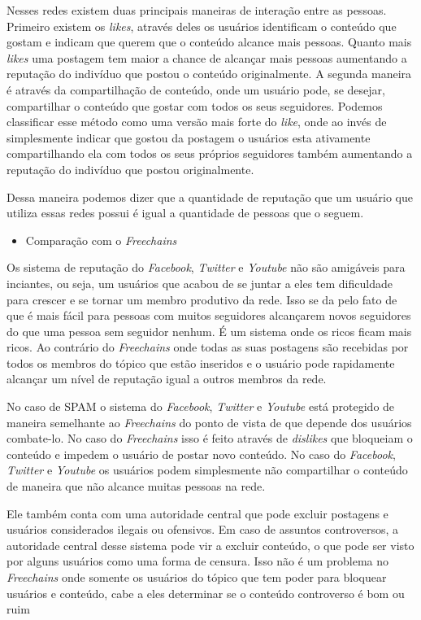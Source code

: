 \documentclass[12pt]{article}
\newcommand{\FC} {\textit{Freechains}\xspace}
\begin{document}
Nesses redes existem duas principais maneiras de interação entre as pessoas.
Primeiro existem os \textit{likes}, através deles os usuários identificam o conteúdo que gostam e indicam que querem que o conteúdo alcance mais pessoas.
Quanto mais \textit{likes} uma postagem tem maior a chance de alcançar mais pessoas aumentando a reputação do indivíduo que postou o conteúdo originalmente.
A segunda maneira é através da compartilhação de conteúdo, onde um usuário pode, se desejar, compartilhar o conteúdo que gostar com todos os seus seguidores.
Podemos classificar esse método como uma versão mais forte do \textit{like}, onde ao invés de simplesmente indicar que gostou da postagem o usuários esta ativamente compartilhando ela com todos os seus próprios seguidores também aumentando a reputação do indivíduo que postou originalmente.

Dessa maneira podemos dizer que a quantidade de reputação que um usuário que utiliza essas redes possui é igual a quantidade de pessoas que o seguem.

\begin{itemize}
    \item Comparação com o \FC
\end{itemize}

Os sistema de reputação do \textit{Facebook}, \textit{Twitter} e \textit{Youtube} não são amigáveis para inciantes, ou seja, um usuários que acabou de se juntar a eles tem dificuldade para crescer e se tornar um membro produtivo da rede.
Isso se da pelo fato de que é mais fácil para pessoas com muitos seguidores alcançarem novos seguidores do que uma pessoa sem seguidor nenhum.
É um sistema onde os ricos ficam mais ricos.
Ao contrário do \FC onde todas as suas postagens são recebidas por todos os membros do tópico que estão inseridos e o usuário pode rapidamente alcançar um nível de reputação igual a outros membros da rede.


No caso de SPAM o sistema do \textit{Facebook}, \textit{Twitter} e \textit{Youtube} está protegido de maneira semelhante ao \FC do ponto de vista de que depende dos usuários combate-lo.
No caso do \FC isso é feito através de \textit{dislikes} que bloqueiam o conteúdo e impedem o usuário de postar novo conteúdo.
No caso do \textit{Facebook}, \textit{Twitter} e \textit{Youtube} os usuários podem simplesmente não compartilhar o conteúdo de maneira que não alcance muitas pessoas na rede.

Ele também conta com uma autoridade central que pode excluir postagens e usuários considerados ilegais ou ofensivos.
Em caso de assuntos controversos, a autoridade central desse sistema pode vir a excluir conteúdo,  o que pode ser visto por alguns usuários como uma forma de censura.
Isso não é um problema no \FC onde somente os usuários do tópico que tem poder para bloquear usuários e conteúdo, cabe a eles determinar se o conteúdo controverso é bom ou ruim
\end{document}
